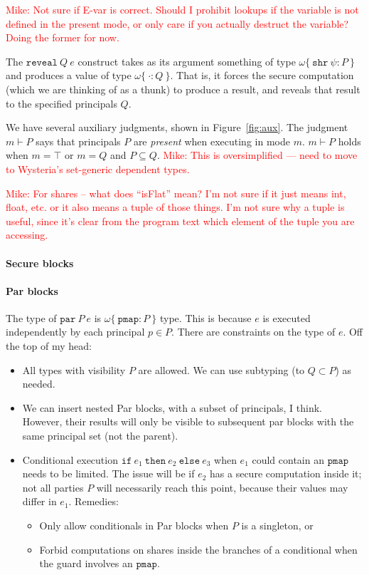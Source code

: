 \documentclass[10pt]{article}
\newcommand{\kw}[1]{\ensuremath{\mathtt{#1}}}
\newcommand{\ssec}{\ensuremath{\mathtt{\cdot}}}
\newcommand{\isec}{\ensuremath{\mathtt{pmap}}}
\newcommand{\sshare}[1]{\ensuremath{\mathtt{shr}~{#1}}}
\newcommand{\sectyp}[3]{\ensuremath{{#1} \{~{#2}:{#3}~\}}}
\newcommand{\epar}[2]{\ensuremath{\kw{par}~{#1}~{#2}}}
\newcommand{\ereveal}[2]{\ensuremath{\kw{reveal}~{#1}~{#2}}}
\newcommand{\econd}[3]{\ensuremath{\kw{if}~{#1}~\kw{then}~{#2}~\kw{else}~{#3}}}
\newcommand{\mwh}[1]{\textcolor{red}{Mike: #1}}
\begin{document}
\mwh{Not sure if E-var is correct. Should I prohibit lookups if the
  variable is not defined in the present mode, or only care if you actually
  destruct the variable? Doing the former for now.}

The $\ereveal{Q}{e}$ construct takes as its argument something of type
$\sectyp{\omega}{\sshare{\psi}}{P}$ and produces a value of type
$\sectyp{\omega}{\ssec}{Q}$. That is, it forces the secure computation
(which we are thinking of as a thunk) to produce a result, and reveals
that result to the specified principals $Q$.

We have several auxiliary judgments, shown in
Figure~\ref{fig:aux}. The judgment $m \vdash P$ says that principals
$P$ are \emph{present} when executing in mode $m$. $m \vdash P$ holds
when $m = \top$ or $m = Q$ and $P \subseteq Q$. \mwh{This is
  oversimplified --- need to move to Wysteria's set-generic dependent
  types.}

\mwh{For shares -- what does ``isFlat'' mean? I'm not sure if it just means
int, float, etc. or it also means a tuple of those things. I'm not
sure why a tuple is useful, since it's clear from the program text
which element of the tuple you are accessing.}

\paragraph*{Secure blocks}

\paragraph*{Par blocks}

The type of $\epar{P}{e} $ is $\sectyp{\omega}{\isec}{P}$
type. This is because $e$ is executed independently by each principal
$p \in P$. There are constraints on the type of $e$. Off the top of my
head:
\begin{itemize}
\item All types with visibility $P$ are allowed. We can use subtyping
  (to $Q \subset P$) as needed.
  \item We can insert nested Par blocks, with a subset of principals,
    I think. However, their results will only be visible to subsequent
    par blocks with the same principal set (not the parent).
  \item Conditional execution $\econd{e_1}{e_2}{e_3}$ when $e_1$ could
    contain an $\isec$ needs to be limited. The issue will be if $e_2$
    has a secure computation inside it; not all parties $P$ will
    necessarily reach this point, because their values may differ in
    $e_1$. Remedies:
    \begin{itemize}
      \item Only allow conditionals in Par blocks when $P$ is a singleton, or
      \item Forbid computations on shares inside the branches of a
        conditional when the guard involves an \isec.
      \end{itemize}
\end{itemize}
\end{document}
